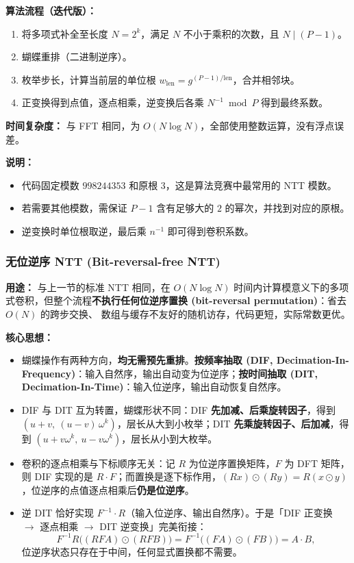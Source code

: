 \vspace{0.3cm}

\textbf{算法流程（迭代版）：}
\begin{enumerate}
    \item 将多项式补全至长度 $N=2^k$，满足 $N$ 不小于乘积的次数，且 $N \mid (P-1)$。
    \item 蝴蝶重排（二进制逆序）。
    \item 枚举步长，计算当前层的单位根 $w_{\text{len}}=g^{(P-1)/\text{len}}$，合并相邻块。
    \item 正变换得到点值，逐点相乘，逆变换后各乘 $N^{-1}\bmod P$ 得到最终系数。
\end{enumerate}

\textbf{时间复杂度：} 与 FFT 相同，为 $O(N\log N)$，全部使用整数运算，没有浮点误差。



\textbf{说明：}
\begin{itemize}
    \item 代码固定模数 $998244353$ 和原根 $3$，这是算法竞赛中最常用的 NTT 模数。
    \item 若需要其他模数，需保证 $P-1$ 含有足够大的 $2$ 的幂次，并找到对应的原根。
    \item 逆变换时单位根取逆，最后乘 $n^{-1}$ 即可得到卷积系数。
\end{itemize}

\subsubsection{无位逆序 NTT (Bit-reversal-free NTT)}

\textbf{用途：}  
与上一节的标准 NTT 相同，在 $O(N\log N)$ 时间内计算模意义下的多项式卷积，但整个流程\textbf{不执行任何位逆序置换 (bit-reversal permutation)}：省去 $O(N)$ 的跨步交换、 数组与缓存不友好的随机访存，代码更短，实际常数更优。

\textbf{核心思想：}
\begin{itemize}
    \item 蝴蝶操作有两种方向，\textbf{均无需预先重排}。\textbf{按频率抽取 (DIF, Decimation-In-Frequency)}：输入自然序，输出自动变为位逆序；\textbf{按时间抽取 (DIT, Decimation-In-Time)}：输入位逆序，输出自动恢复自然序。
    \item DIF 与 DIT 互为转置，蝴蝶形状不同：DIF \textbf{先加减、后乘旋转因子}，得到 $(u+v,\ (u-v)\,\omega^{k})$，层长从大到小枚举；DIT \textbf{先乘旋转因子、后加减}，得到 $(u+v\omega^{k},\ u-v\omega^{k})$，层长从小到大枚举。
    \item 卷积的逐点相乘与下标顺序无关：记 $R$ 为位逆序置换矩阵，$F$ 为 DFT 矩阵，则 DIF 实现的是 $R\cdot F$；而置换是逐下标作用，$(Rx)\odot(Ry)=R(x\odot y)$，位逆序的点值逐点相乘后\textbf{仍是位逆序}。
    \item 逆 DIT 恰好实现 $F^{-1}\cdot R$（输入位逆序、输出自然序）。于是「DIF 正变换 $\to$ 逐点相乘 $\to$ DIT 逆变换」完美衔接：\[F^{-1}R\big((RFA)\odot(RFB)\big)=F^{-1}\big((FA)\odot(FB)\big)=A\cdot B,\] 位逆序状态只存在于中间，任何显式置换都不需要。
\end{itemize}

